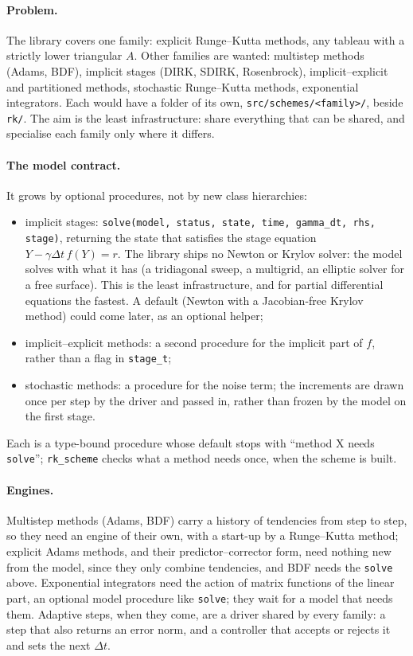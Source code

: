 \documentclass[11pt,a4paper]{article}
\newcommand{\dt}{\Delta t}
\newcommand{\code}[1]{\texttt{#1}}
\begin{document}
\paragraph{Problem.} The library covers one family: explicit Runge--Kutta
methods, any tableau with a strictly lower triangular $A$. Other families are
wanted: multistep methods (Adams, BDF), implicit stages (DIRK, SDIRK,
Rosenbrock), implicit--explicit and partitioned methods, stochastic
Runge--Kutta methods, exponential integrators. Each would have a folder of
its own, \code{src/schemes/<family>/}, beside \code{rk/}. The aim is the least infrastructure: share
everything that can be shared, and specialise each family only where it
differs.

\paragraph{The model contract.} It grows by optional procedures, not by new
class hierarchies:
\begin{itemize}
  \item implicit stages: \code{solve(model, status, state, time, gamma\_dt,
    rhs, stage)}, returning the state that satisfies the stage equation
    $Y - \gamma\dt\, f(Y) = r$. The library ships no Newton or Krylov solver:
    the model solves with what it has (a tridiagonal sweep, a multigrid, an
    elliptic solver for a free surface). This is the least infrastructure,
    and for partial differential equations the fastest. A default (Newton
    with a Jacobian-free Krylov method) could come later, as an optional
    helper;
  \item implicit--explicit methods: a second procedure for the implicit part
    of $f$, rather than a flag in \code{stage\_t};
  \item stochastic methods: a procedure for the noise term; the increments
    are drawn once per step by the driver and passed in, rather than frozen
    by the model on the first stage.
\end{itemize}
Each is a type-bound procedure whose default stops with ``method X needs
\code{solve}''; \code{rk\_scheme} checks what a method needs once, when the
scheme is built.

\paragraph{Engines.} Multistep methods (Adams, BDF) carry a history of
tendencies from step to step, so they need an engine of their own, with a
start-up by a Runge--Kutta method; explicit Adams methods, and their
predictor--corrector form, need nothing new from the model, since they only
combine tendencies, and BDF needs the \code{solve} above. Exponential
integrators need the action of matrix functions of the linear part, an
optional model procedure like \code{solve}; they wait for a model that needs
them. Adaptive steps, when they come, are a driver shared by every family: a
step that also returns an error norm, and a controller that accepts or rejects
it and sets the next $\dt$.
\end{document}
